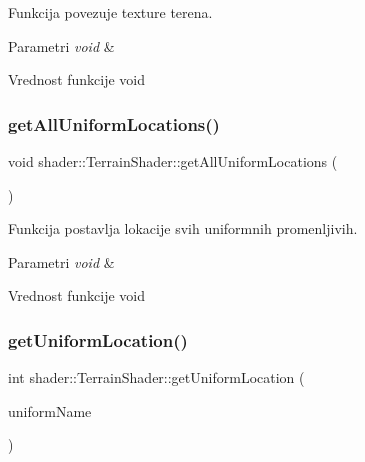 Funkcija povezuje texture terena. 


\begin{DoxyParams}{Parametri}
{\em void} & \\
\hline
\end{DoxyParams}
\begin{DoxyReturn}{Vrednost funkcije}
void 
\end{DoxyReturn}
\mbox{\label{classshader_1_1TerrainShader_ad1a4ef8d420ef0a4d7840a12912ddbfe}} 
\subsubsection{\texorpdfstring{get\+All\+Uniform\+Locations()}{getAllUniformLocations()}}
{\footnotesize\ttfamily void shader\+::\+Terrain\+Shader\+::get\+All\+Uniform\+Locations (\begin{DoxyParamCaption}\item[{void}]{ }\end{DoxyParamCaption})}



Funkcija postavlja lokacije svih uniformnih promenljivih. 


\begin{DoxyParams}{Parametri}
{\em void} & \\
\hline
\end{DoxyParams}
\begin{DoxyReturn}{Vrednost funkcije}
void 
\end{DoxyReturn}
\mbox{\label{classshader_1_1TerrainShader_a69db3dcab0c9d49d9d57ef1121dc7763}} 
\subsubsection{\texorpdfstring{get\+Uniform\+Location()}{getUniformLocation()}}
{\footnotesize\ttfamily int shader\+::\+Terrain\+Shader\+::get\+Uniform\+Location (\begin{DoxyParamCaption}\item[{const char $\ast$}]{uniform\+Name }\end{DoxyParamCaption})}



